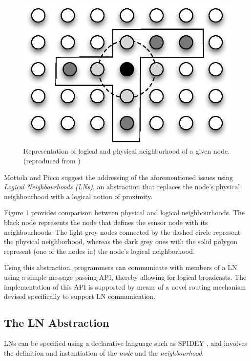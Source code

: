 \begin{figure} 
\centering
\includegraphics[scale=0.71]{img/LN_physical_vs_logical.eps} 
\caption[Difference between physical and logical neighborhoods]{Representation 
of logical and physical neighborhood of a given node. (reproduced from
\cite{mottola_LN:2006})}
\label{Fig:LN_physical_vs_logical}
\end{figure} 

Mottola and Picco \cite{mottola_LN:2006} suggest the addressing of the
aforementioned issues using \emph{Logical Neighbourhoods (LNs)}, an
abstraction that replaces the node's physical neighbourhood with a logical notion of
proximity. 

Figure \ref{Fig:LN_physical_vs_logical} provides comparison between
physical and logical neighbourhoods. The black node represents the node
that defines the sensor node with its neighbourhoods. The light grey nodes
connected by the dashed circle represent the physical neighborhood, whereas the
dark grey ones with the solid polygon represent (one of the nodes in) the
node's logical neighborhood.


Using this
abstraction, programmers can communicate with members of a LN using a simple message passing API,
thereby allowing for logical broadcasts. The implementation of this API is
supported by means of a novel routing mechanism devised specifically to support
LN communication. 

\subsection{The LN Abstraction}

LNs can be specified using a declarative language such as SPIDEY
\cite{mottola_LN:2006, mottola_LNScoping:2006}, and
involves the definition and instantiation of the \emph{node} and the
\emph{neighbourhood}. 

